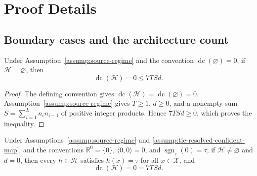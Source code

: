 \appendix

\section{Proof Details}
\label{sec:proof-details}

\subsection{Boundary cases and the architecture count}
\label{app:step-001}

\begin{proposition}
\label{prop:step-001-empty}
Under Assumption~\ref{assump:source-regime} and the convention
$\operatorname{dc}(\varnothing)=0$, if $\mathcal H=\varnothing$, then
\[
\operatorname{dc}(\mathcal H)=0\leq 7TSd.
\]
\end{proposition}

\begin{proof}
The defining convention gives
$\operatorname{dc}(\mathcal H)=\operatorname{dc}(\varnothing)=0$.
Assumption~\ref{assump:source-regime} gives $T\geq 1$, $d\geq 0$, and a
nonempty sum $S=\sum_{i=1}^L n_i n_{i-1}$ of positive integer products.
Hence $7TSd\geq 0$, which proves the inequality.
\end{proof}

\begin{lemma}
\label{lem:step-001-zero}
Under Assumptions~\ref{assump:source-regime} and
\ref{assump:tie-resolved-confident-map}, and the conventions
$\mathbb R^0=\{0\}$, $\langle 0,0\rangle=0$, and
$\operatorname{sgn}_{\tau}(0)=\tau$, if $\mathcal H\neq\varnothing$ and
$d=0$, then every $h\in\mathcal H$ satisfies $h(x)=\tau$ for all
$x\in\mathcal X$, and
\[
\operatorname{dc}(\mathcal H)=0=7TSd.
\]
\end{lemma}

